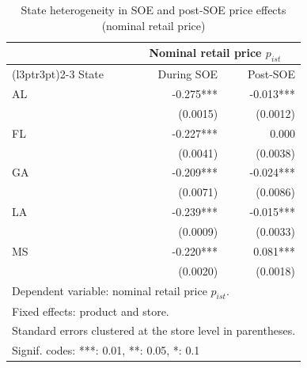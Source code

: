 \begin{table}[!h]
\centering
\caption{\label{tab:tab:price_reg_state_heterog}State heterogeneity in SOE and post-SOE price effects (nominal retail price)}
\centering
\begin{tabular}[t]{lrr}
\toprule
\multicolumn{1}{c}{ } & \multicolumn{2}{c}{Nominal retail price $p_{ist}$} \\
\cmidrule(l{3pt}r{3pt}){2-3}
State & During SOE & Post-SOE\\
\midrule
AL & -0.275*** & -0.013***\\
 & (0.0015) & (0.0012)\\
FL & -0.227*** & 0.000\\
 & (0.0041) & (0.0038)\\
GA & -0.209*** & -0.024***\\
\addlinespace
 & (0.0071) & (0.0086)\\
LA & -0.239*** & -0.015***\\
 & (0.0009) & (0.0033)\\
MS & -0.220*** & 0.081***\\
 & (0.0020) & (0.0018)\\
\bottomrule
\multicolumn{3}{l}{\rule{0pt}{1em}Dependent variable: nominal retail price $p_{ist}$.}\\
\multicolumn{3}{l}{\rule{0pt}{1em}Fixed effects: product and store.}\\
\multicolumn{3}{l}{\rule{0pt}{1em}Standard errors clustered at the store level in parentheses.}\\
\multicolumn{3}{l}{\rule{0pt}{1em}Signif. codes: ***: 0.01, **: 0.05, *: 0.1}\\
\end{tabular}
\end{table}
